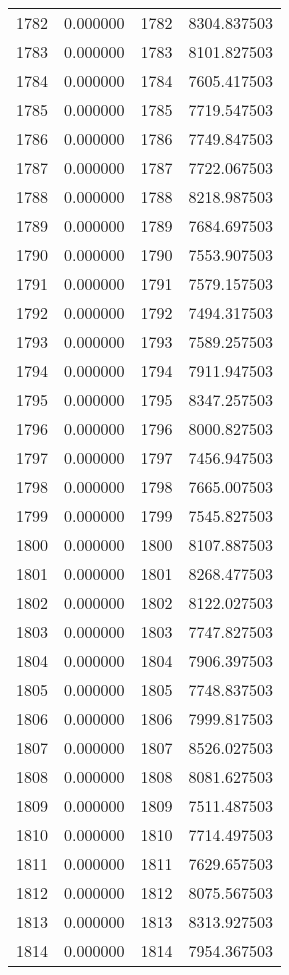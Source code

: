 \documentclass[12pt]{article}
\begin{document}
\begin{longtable}{@{}cccc@{}}
1782 & 0.000000 & 1782 & 8304.837503 \\
1783 & 0.000000 & 1783 & 8101.827503 \\
1784 & 0.000000 & 1784 & 7605.417503 \\
1785 & 0.000000 & 1785 & 7719.547503 \\
1786 & 0.000000 & 1786 & 7749.847503 \\
1787 & 0.000000 & 1787 & 7722.067503 \\
1788 & 0.000000 & 1788 & 8218.987503 \\
1789 & 0.000000 & 1789 & 7684.697503 \\
1790 & 0.000000 & 1790 & 7553.907503 \\
1791 & 0.000000 & 1791 & 7579.157503 \\
1792 & 0.000000 & 1792 & 7494.317503 \\
1793 & 0.000000 & 1793 & 7589.257503 \\
1794 & 0.000000 & 1794 & 7911.947503 \\
1795 & 0.000000 & 1795 & 8347.257503 \\
1796 & 0.000000 & 1796 & 8000.827503 \\
1797 & 0.000000 & 1797 & 7456.947503 \\
1798 & 0.000000 & 1798 & 7665.007503 \\
1799 & 0.000000 & 1799 & 7545.827503 \\
1800 & 0.000000 & 1800 & 8107.887503 \\
1801 & 0.000000 & 1801 & 8268.477503 \\
1802 & 0.000000 & 1802 & 8122.027503 \\
1803 & 0.000000 & 1803 & 7747.827503 \\
1804 & 0.000000 & 1804 & 7906.397503 \\
1805 & 0.000000 & 1805 & 7748.837503 \\
1806 & 0.000000 & 1806 & 7999.817503 \\
1807 & 0.000000 & 1807 & 8526.027503 \\
1808 & 0.000000 & 1808 & 8081.627503 \\
1809 & 0.000000 & 1809 & 7511.487503 \\
1810 & 0.000000 & 1810 & 7714.497503 \\
1811 & 0.000000 & 1811 & 7629.657503 \\
1812 & 0.000000 & 1812 & 8075.567503 \\
1813 & 0.000000 & 1813 & 8313.927503 \\
1814 & 0.000000 & 1814 & 7954.367503 \\

\end{longtable}
\end{document}
